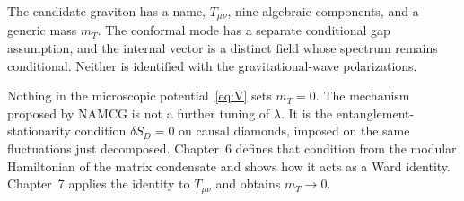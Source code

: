 The candidate graviton has a name, \(T_{\mu\nu}\), nine algebraic
components, and a generic mass \(m_T\). The conformal mode has a
separate conditional gap assumption, and the internal vector is a
distinct field whose spectrum remains conditional. Neither is
identified with the gravitational-wave polarizations.

Nothing in the microscopic potential~\eqref{eq:V} sets \(m_T=0\).
The mechanism proposed by NAMCG is not a further tuning of
\(\lambda\). It is the entanglement-stationarity condition
\(\delta S_D=0\) on causal diamonds, imposed on the same fluctuations
just decomposed. Chapter~6 defines that condition from the modular
Hamiltonian of the matrix condensate and shows how it acts as a Ward
identity. Chapter~7 applies the identity to \(T_{\mu\nu}\) and
obtains \(m_T\to 0\).